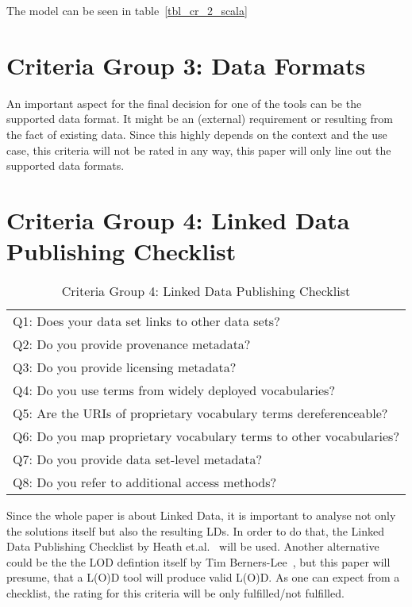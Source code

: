 The model can be seen in table~\ref{tbl_cr_2_scala}

\section{Criteria Group 3: Data Formats}

An important aspect for the final decision for one of the tools can be the supported data format. It might be an (external) requirement or resulting from the fact of existing data. Since this highly depends on the context and the use case, this criteria will not be rated in any way, this paper will only line out the supported data formats.

\section{Criteria Group 4: Linked Data Publishing Checklist}

\begin{table}[htb]
\centering
\begin{tabular}{|l|}
\rowcolor[HTML]{EFEFEF} 
\hline
\multicolumn{1}{|c|}{\textbf{Criteria}}                        \\ \hline
Q1: Does your data set links to other data sets?                   \\ \hline
Q2: Do you provide provenance metadata?                            \\ \hline
Q3: Do you provide licensing metadata?                             \\ \hline
Q4: Do you use terms from widely deployed vocabularies?            \\ \hline
Q5: Are the URIs of proprietary vocabulary terms dereferenceable?  \\ \hline
Q6: Do you map proprietary vocabulary terms to other vocabularies? \\ \hline
Q7: Do you provide data set-level metadata?                        \\ \hline
Q8: Do you refer to additional access methods?                     \\ \hline
\end{tabular}
\caption{Criteria Group 4: Linked Data Publishing Checklist}
\label{tbl_cr_4_scala}
\end{table}

Since the whole paper is about Linked Data, it is important to analyse not only the solutions itself but also the resulting LDs. In order to do that, the Linked Data Publishing Checklist by Heath et.al.~\cite{heath2011linked} will be used. Another alternative could be the the LOD defintion itself by Tim Berners-Lee~\cite{berners2006linked}, but this paper will presume, that a L(O)D tool will produce valid L(O)D. As one can expect from a checklist, the rating for this criteria will be only fulfilled/not fulfilled.

